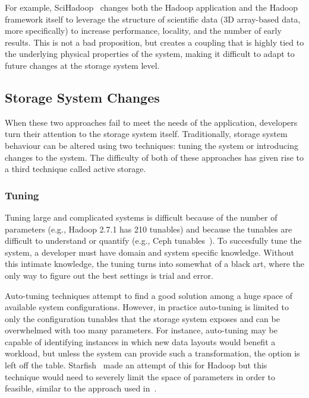 \documentclass[10pt,twocolumn]{article}
\begin{document}
For example, SciHadoop~\cite{buck:hpc2011-scihadoop,buck:sc2013-scidr} changes both the Hadoop
application and the Hadoop framework itself to leverage the structure of
scientific data (3D array-based data, more specifically) to increase
performance, locality, and the number of early results. This is not a
bad proposition, but creates a coupling that is highly tied to the
underlying physical properties of the system, making it difficult to
adapt to future changes at the storage system level.

\subsection{Storage System Changes}\label{storage-changes}

When these two approaches fail to meet the needs of the application,
developers turn their attention to the storage system itself.
Traditionally, storage system behaviour can be altered using two
techniques: tuning the system or introducing changes to the system. The
difficulty of both of these approaches has given rise to a third
technique called active storage.

\subsubsection{Tuning}\label{tuning}

Tuning large and complicated systems is difficult because of the number
of parameters (e.g., Hadoop 2.7.1 has 210 tunables) and because the
tunables are difficult to understand or quantify (e.g., Ceph tunables~\cite{sevilla:sc15-mantle}). To succesfully tune the system, a
developer must have domain and system specific knowledge. Without this
intimate knowledge, the tuning turns into somewhat of a black art, where
the only way to figure out the best settings is trial and error.

Auto-tuning techniques attempt to find a good solution among a huge space of
available system configurations. However, in practice auto-tuning is limited
to only the configuration tunables that the storage system exposes and can be
overwhelmed with too many parameters.  For instance, auto-tuning may be
capable of identifying instances in which new data layouts would benefit a
workload, but unless the system can provide such a transformation, the option
is left off the table.  Starfish~\cite{herodotou:cidr2011-starfish} made
an attempt of this for Hadoop but this technique would need to severely limit
the space of parameters in order to feasible, similar to the approach used in~\cite{behzad:sc2013-autotuning}.
\end{document}
